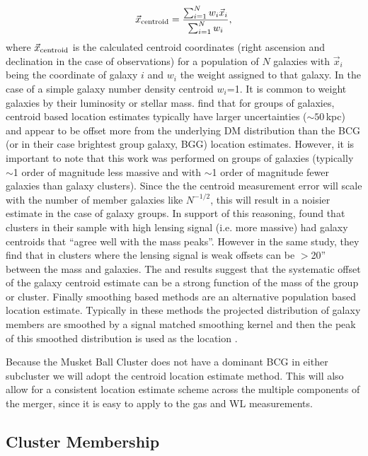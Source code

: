 \begin{equation}
\vec{x}_{\rm centroid} = \frac{\sum_{i=1}^N w_i\vec{x}_i}{\sum_{i=1}^N w_i},
\label{equation:WeightedCentroid}
\end{equation}
where $\vec{x}_{\rm centroid}$ is the calculated centroid coordinates (right ascension and declination in the case of observations) for a population of $N$ galaxies with $\vec{x}_i$ being the coordinate of galaxy $i$ and $w_i$ the weight assigned to that galaxy.
In the case of a simple galaxy number density centroid $w_i$=1.
It is common to weight galaxies by their luminosity or stellar mass.
\citet{George:2012uo} find that for groups of galaxies, centroid based location estimates typically have larger uncertainties ($\sim50$\,kpc) and appear to be offset more from the underlying DM distribution than the BCG (or in their case brightest group galaxy, BGG) location estimates.
However, it is important to note that this work was performed on groups of galaxies (typically $\sim$1 order of magnitude less massive and with $\sim$1 order of magnitude fewer galaxies than galaxy clusters).
Since the the centroid measurement error will scale with the number of member galaxies like $N^{-1/2}$, this will result in a noisier estimate in the case of galaxy groups.
In support of this reasoning, \citet{Jee:2011we} found that clusters in their sample with high lensing signal (i.e. more massive) had galaxy centroids that ``agree well with the mass peaks''.
However in the same study, they find that in clusters where the lensing signal is weak offsets can be $>$20'' between the mass and galaxies.
The \citet{George:2012uo} and \citet{Jee:2011we} results suggest that the systematic offset of the galaxy centroid estimate can be a strong function of the mass of the group or cluster.
Finally smoothing based methods are an alternative population based location estimate.
Typically in these methods the projected distribution of galaxy members are smoothed by a signal matched smoothing kernel and then the peak of this smoothed distribution is used as the location \citep[see e.g.][]{Merritt:1994fc, Gonzalez:2002kl, Randall:2008hs}.

Because the Musket Ball Cluster does not have a dominant BCG in either subcluster we will adopt the centroid location estimate method.
This will also allow for a consistent location estimate scheme across the multiple components of the merger, since it is easy to apply to the gas and WL measurements.


\subsection{Cluster Membership}\label{section:ClusterMembership}

